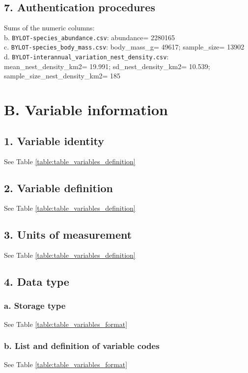 \documentclass[a4paper,twoside,12pt]{article}
\begin{document}
                        \subsection*{7. Authentication procedures}
                        Sums of the numeric columns: \\
                        b. \texttt{BYLOT-species\_abundance.csv}: abundance= 2280165\\
                        c. \texttt{BYLOT-species\_body\_mass.csv}: body\_mass\_g= 49617; sample\_size= 13902\\
                        d. \texttt{BYLOT-interannual\_variation\_nest\_density.csv}: mean\_nest\_density\_km2= 19.991; sd\_nest\_density\_km2= 10.539; sample\_size\_nest\_density\_km2= 185
                        
    \section*{B. Variable information}
                \subsection*{1. Variable identity} See Table \ref{table:table_variables_definition}
        \subsection*{2. Variable definition} See Table \ref{table:table_variables_definition}
        \subsection*{3. Units of measurement} See Table \ref{table:table_variables_definition}
        \newpage
        
        
       \newpage
        
        \subsection*{4. Data type}
                    \subsubsection*{a. Storage type} See Table \ref{table:table_variables_format}
                    \subsubsection*{b. List and definition of variable codes} See Table \ref{table:table_variables_format}
\end{document}
